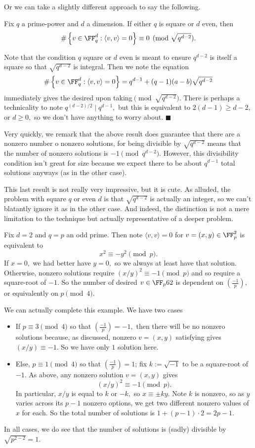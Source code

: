 Or we can take a slightly different approach to say the following.
\begin{proposition}
    Fix $q$ a prime-power and $d$ a dimension. If either $q$ is square or $d$ even, then
    \[\#\left\{v\in\FF_q^d:\langle v,v\rangle=0\right\}\equiv0\pmod{\sqrt{q^{d-2}}}.\]
\end{proposition}
Note that the condition $q$ square or $d$ even is meant to ensure $q^{d-2}$ is itself a square so that $\sqrt{q^{d-2}}$ is integral. Then we note the equation
\[\#\left\{v\in\FF_q^d:\langle v,v\rangle=0\right\}=q^{d-1}+(q-1)(a-b)\sqrt{q^{d-2}}\]
immediately gives the desired upon taking$\pmod{\sqrt{q^{d-2}}}.$ There is perhaps a technicality to note $q^{(d-2)/2}\mid q^{d-1},$ but this is equivalent to $2(d-1)\ge d-2,$ or $d\ge0,$ so we don't have anything to worry about. $\blacksquare$

Very quickly, we remark that the above result does guarantee that there are a nonzero number o nonzero solutions, for being divisible by $\sqrt{q^{d-2}}$ means that the number of nonzero solutions is $-1\pmod{q^{d-2}}.$ However, this divisibility condition isn't great for size because we expect there to be about $q^{d-1}$ total solutions anyways (as in the other case).

This last result is not really very impressive, but it is cute. As alluded, the problem with square $q$ or even $d$ is that $\sqrt{q^{d-2}}$ is actually an integer, so we can't blatantly ignore it as in the other case. And indeed, the distinction is not a mere limitation to the technique but actually representative of a deeper problem.
\begin{example}
    Fix $d=2$ and $q=p$ an odd prime. Then note $\langle v,v\rangle=0$ for $v=(x,y)\in\FF_p^2$ is equivalent to
    \[x^2\equiv-y^2\pmod p.\]
    If $x=0,$ we had better have $y=0,$ so we always at least have that solution. Otherwise, nonzero solutions require $(x/y)^2\equiv-1\pmod p$ and so require a square-root of $-1.$ So the number of desired $v\in\FF_p62$ is dependent on $\left(\frac{-1}p\right),$ or equivalently on $p\pmod4.$
\end{example}
We can actually complete this example. We have two cases
\begin{itemize}
    \item If $p\equiv3\pmod4$ so that $\left(\frac{-1}p\right)=-1,$ then there will be no nonzero solutions because, as discussed, nonzero $v=(x,y)$ satisfying gives $(x/y)\equiv-1.$ So we have only $\boxed1$ solution here.
    \item Else, $p\equiv1\pmod4$ so that $\left(\frac{-1}p\right)=1$; fix $k:=\sqrt{-1}$ to be a square-root of $-1.$ As above, any nonzero solution $v=(x,y)$ gives
    \[(x/y)^2\equiv-1\pmod p.\]
    In particular, $x/y$ is equal to $k$ or $-k,$ so $x\equiv\pm ky.$ Note $k$ is nonzero, so as $y$ varies across its $p-1$ nonzero options, we get two different nonzero values of $x$ for each. So the total number of solutions is $1+(p-1)\cdot2=\boxed{2p-1}.$
\end{itemize}
In all cases, we do see that the number of solutions is (sadly) divisible by $\sqrt{p^{2-2}}=1.$

